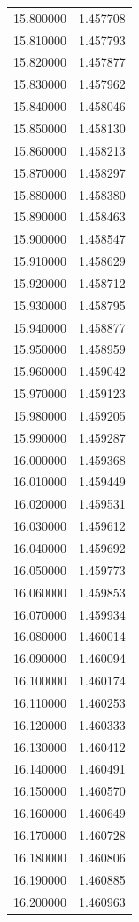 \begin{tabular}{rr}
15.800000 & 1.457708 \\
15.810000 & 1.457793 \\
15.820000 & 1.457877 \\
15.830000 & 1.457962 \\
15.840000 & 1.458046 \\
15.850000 & 1.458130 \\
15.860000 & 1.458213 \\
15.870000 & 1.458297 \\
15.880000 & 1.458380 \\
15.890000 & 1.458463 \\
15.900000 & 1.458547 \\
15.910000 & 1.458629 \\
15.920000 & 1.458712 \\
15.930000 & 1.458795 \\
15.940000 & 1.458877 \\
15.950000 & 1.458959 \\
15.960000 & 1.459042 \\
15.970000 & 1.459123 \\
15.980000 & 1.459205 \\
15.990000 & 1.459287 \\
16.000000 & 1.459368 \\
16.010000 & 1.459449 \\
16.020000 & 1.459531 \\
16.030000 & 1.459612 \\
16.040000 & 1.459692 \\
16.050000 & 1.459773 \\
16.060000 & 1.459853 \\
16.070000 & 1.459934 \\
16.080000 & 1.460014 \\
16.090000 & 1.460094 \\
16.100000 & 1.460174 \\
16.110000 & 1.460253 \\
16.120000 & 1.460333 \\
16.130000 & 1.460412 \\
16.140000 & 1.460491 \\
16.150000 & 1.460570 \\
16.160000 & 1.460649 \\
16.170000 & 1.460728 \\
16.180000 & 1.460806 \\
16.190000 & 1.460885 \\
16.200000 & 1.460963 \\

\end{tabular}
